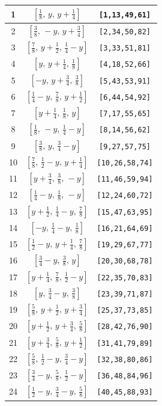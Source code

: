 \documentclass[fleqn,8pt]{jsarticle}
\begin{document}
\begin{longtable}{ccc}
1 & $\left[ \frac{1}{8},\, y,\, y + \frac{1}{4} \right]$ & {\tt [1,13,49,61]} \\ \hline
2 & $\left[ \frac{3}{8},\, - y,\, y + \frac{3}{4} \right]$ & {\tt [2,34,50,82]} \\ \hline
3 & $\left[ \frac{7}{8},\, y + \frac{1}{2},\, \frac{1}{4} - y \right]$ & {\tt [3,33,51,81]} \\ \hline
4 & $\left[ y,\, y + \frac{1}{4},\, \frac{1}{8} \right]$ & {\tt [4,18,52,66]} \\ \hline
5 & $\left[ - y,\, y + \frac{3}{4},\, \frac{3}{8} \right]$ & {\tt [5,43,53,91]} \\ \hline
6 & $\left[ \frac{1}{4} - y,\, \frac{7}{8},\, y + \frac{1}{2} \right]$ & {\tt [6,44,54,92]} \\ \hline
7 & $\left[ y + \frac{1}{4},\, \frac{1}{8},\, y \right]$ & {\tt [7,17,55,65]} \\ \hline
8 & $\left[ \frac{1}{8},\, - y,\, \frac{1}{4} - y \right]$ & {\tt [8,14,56,62]} \\ \hline
9 & $\left[ \frac{3}{8},\, y,\, \frac{3}{4} - y \right]$ & {\tt [9,27,57,75]} \\ \hline
10 & $\left[ \frac{7}{8},\, \frac{1}{2} - y,\, y + \frac{1}{4} \right]$ & {\tt [10,26,58,74]} \\ \hline
11 & $\left[ y + \frac{3}{4},\, \frac{3}{8},\, - y \right]$ & {\tt [11,46,59,94]} \\ \hline
12 & $\left[ \frac{1}{4} - y,\, \frac{1}{8},\, - y \right]$ & {\tt [12,24,60,72]} \\ \hline
13 & $\left[ y + \frac{1}{2},\, \frac{1}{4} - y,\, \frac{7}{8} \right]$ & {\tt [15,47,63,95]} \\ \hline
14 & $\left[ - y,\, \frac{1}{4} - y,\, \frac{1}{8} \right]$ & {\tt [16,21,64,69]} \\ \hline
15 & $\left[ \frac{1}{2} - y,\, y + \frac{1}{4},\, \frac{7}{8} \right]$ & {\tt [19,29,67,77]} \\ \hline
16 & $\left[ \frac{3}{4} - y,\, \frac{3}{8},\, y \right]$ & {\tt [20,30,68,78]} \\ \hline
17 & $\left[ y + \frac{1}{4},\, \frac{7}{8},\, \frac{1}{2} - y \right]$ & {\tt [22,35,70,83]} \\ \hline
18 & $\left[ y,\, \frac{3}{4} - y,\, \frac{3}{8} \right]$ & {\tt [23,39,71,87]} \\ \hline
19 & $\left[ \frac{5}{8},\, y + \frac{1}{2},\, y + \frac{3}{4} \right]$ & {\tt [25,37,73,85]} \\ \hline
20 & $\left[ y + \frac{1}{2},\, y + \frac{3}{4},\, \frac{5}{8} \right]$ & {\tt [28,42,76,90]} \\ \hline
21 & $\left[ y + \frac{3}{4},\, \frac{5}{8},\, y + \frac{1}{2} \right]$ & {\tt [31,41,79,89]} \\ \hline
22 & $\left[ \frac{5}{8},\, \frac{1}{2} - y,\, \frac{3}{4} - y \right]$ & {\tt [32,38,80,86]} \\ \hline
23 & $\left[ \frac{3}{4} - y,\, \frac{5}{8},\, \frac{1}{2} - y \right]$ & {\tt [36,48,84,96]} \\ \hline
24 & $\left[ \frac{1}{2} - y,\, \frac{3}{4} - y,\, \frac{5}{8} \right]$ & {\tt [40,45,88,93]} \\
\end{longtable}
\end{document}
